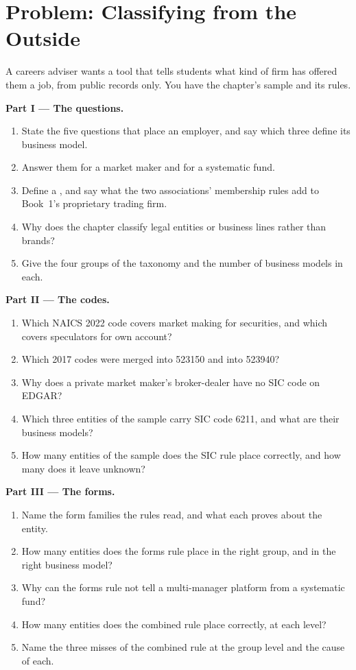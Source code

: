 \section{Problem: Classifying from the Outside}

\begin{problem}\label{pb:in:a-map-of-the-industry:1}
A careers adviser wants a tool that tells students what kind of firm has offered them a job, from public records only.
You have the chapter's sample and its rules.

\medskip\noindent\textbf{Part I --- The questions.}
\begin{enumerate}
\item State the five questions that place an employer, and say which three define its business model.
\item Answer them for a market maker and for a systematic fund.
\item Define a , and say what the two associations' membership rules add to Book~1's proprietary
trading firm.
\item Why does the chapter classify legal entities or business lines rather than brands?
\item Give the four groups of the taxonomy and the number of business models in each.
\end{enumerate}

\medskip\noindent\textbf{Part II --- The codes.}
\begin{enumerate}[resume]
\item Which NAICS 2022 code covers market making for securities, and which covers speculators for own account?
\item Which 2017 codes were merged into 523150 and into 523940?
\item Why does a private market maker's broker-dealer have no SIC code on EDGAR?
\item Which three entities of the sample carry SIC code 6211, and what are their business models?
\item How many entities of the sample does the SIC rule place correctly, and how many does it leave unknown?
\end{enumerate}

\medskip\noindent\textbf{Part III --- The forms.}
\begin{enumerate}[resume]
\item Name the form families the rules read, and what each proves about the entity.
\item How many entities does the forms rule place in the right group, and in the right business model?
\item Why can the forms rule not tell a multi-manager platform from a systematic fund?
\item How many entities does the combined rule place correctly, at each level?
\item Name the three misses of the combined rule at the group level and the cause of each.
\end{enumerate}


\end{problem}
